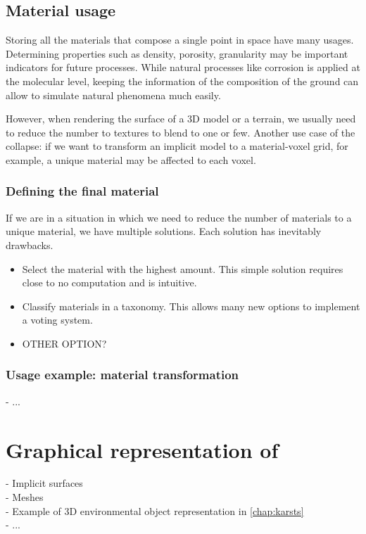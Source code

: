 \subsection{Material usage}
Storing all the materials that compose a single point in space have many usages. Determining properties such as density, porosity, granularity may be important indicators for future processes. While natural processes like corrosion is applied at the molecular level, keeping the information of the composition of the ground can allow to simulate natural phenomena much easily.

However, when rendering the surface of a 3D model or a terrain, we usually need to reduce the number to textures to blend to one or few. Another use case of the collapse: if we want to transform an implicit model to a material-voxel grid, for example, a unique material may be affected to each voxel.

\subsubsection{Defining the final material}
If we are in a situation in which we need to reduce the number of materials to a unique material, we have multiple solutions. Each solution has inevitably drawbacks.
\begin{itemize}
    \item Select the material with the highest amount. This simple solution requires close to no computation and is intuitive.
    \item Classify materials in a taxonomy. This allows many new options to implement a voting system.
    \item OTHER OPTION?
\end{itemize}

\subsubsection{Usage example: material transformation}
- ...

\section{Graphical representation of }
\label{sec:volumic-modeling_graphic-representation-env-objects}
- Implicit surfaces \\
- Meshes \\
- Example of 3D environmental object representation in \cref{chap:karsts} \\
- ...
